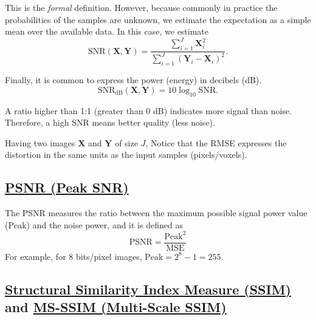 \documentclass{article}
\begin{document}
This is the \emph{formal} definition. However, because commonly in
practice the probabilities of the samples are unknown, we estimate the
expectation as a simple mean over the available data. In this case,
we estimate
\begin{equation}
  \text{SNR}(\mathbf{X},\mathbf{Y}) = \frac{\sum_{i=1}^J\mathbf{X}_i^2}{\sum_{i=1}^J(\mathbf{Y}_i - \mathbf{X}_i)^2}.
  \label{eq:estimated_SNR}
\end{equation}

Finally, it is common to express the power (energy) in decibels (dB).
\begin{equation}
  \text{SNR}_{\text{dB}}(\mathbf{X},\mathbf{Y}) = 10\log_{10}\text{SNR}.
  \label{eq:estimated_SNR_in_dBs}
\end{equation}

A ratio higher than 1:1 (greater than 0 dB) indicates more signal than
noise. Therefore, a high SNR means better quality (less noise).

Having two images $\mathbf{X}$ and $\mathbf{Y}$ of size $J$,
Notice that the RMSE expresses the distortion in the same units as the
input samples (pixels/voxels).


\subsection{\href{https://en.wikipedia.org/wiki/Peak_signal-to-noise_ratio}{PSNR (Peak SNR)}}

The PSNR measures the ratio between the maximum possible signal power
value ($\text{Peak}$) and the noise power, and it is defined as
\begin{equation}
  \text{PSNR} = \frac{\text{Peak}^2}{\text{MSE}}
  \label{eq:PSNR}
\end{equation}
For example, for 8 bits/pixel images, $\text{Peak}=2^8-1=255$.


\subsection{\href{https://en.wikipedia.org/wiki/Structural_similarity_index_measure}{Structural
    Similarity Index Measure (SSIM)} and
  \href{https://en.wikipedia.org/wiki/Structural_similarity_index_measure\#Multi-scale_SSIM}{MS-SSIM
    (Multi-Scale SSIM)}}
\end{document}
